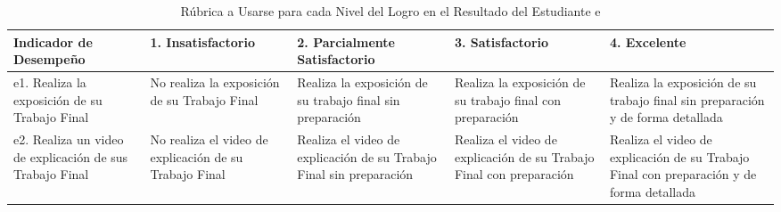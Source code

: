 \begin{landscape}
\begin{table}[h]
\centering
\begin{tabular}{C{5cm}|C{4cm}|C{4cm}|C{4cm}|C{4cm}}
\hline
\textbf{Indicador de Desempeño} & 
\textbf{1. Insatisfactorio} & 
\textbf{2. Parcialmente Satisfactorio} & 
\textbf{3. Satisfactorio} & 
\textbf{4. Excelente} 
\\ \hline
e1. Realiza la exposición de su Trabajo Final &
No realiza la exposición de su Trabajo Final &
Realiza la exposición de su trabajo final sin preparación &
Realiza la exposición de su trabajo final con preparación &
Realiza la exposición de su trabajo final sin preparación y de forma detallada
\\ \hline
e2. Realiza un video de explicación de sus Trabajo Final &
No realiza el video de explicación de su Trabajo Final &
Realiza el video de explicación de su Trabajo Final sin preparación &
Realiza el video de explicación de su Trabajo Final con preparación &
Realiza el video de explicación de su Trabajo Final con preparación y de forma detallada
\\ \hline
\end{tabular}
\caption{Rúbrica a Usarse para cada Nivel del Logro en el Resultado del Estudiante \lbrack e\rbrack}
\label{tab:nivel_rubrica_e} 
\end{table}

\newpage


\end{landscape}

